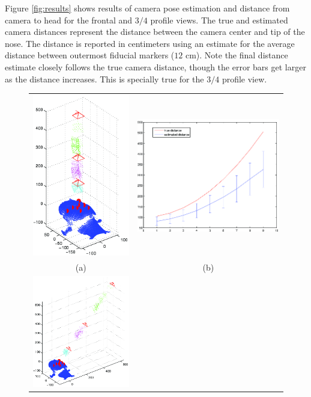 \documentclass[runningheads]{llncs}
\begin{document}
Figure \ref{fig:results} shows results of camera pose estimation and distance from camera to head for the frontal and $3/4$ profile views.  The true and estimated camera distances represent the distance between the camera center and tip of the nose.  The distance is reported in centimeters using an estimate for the average distance between outermost fiducial markers ($12$ cm). Note the final distance estimate closely follows the true camera distance, though the error bars get larger as the distance increases.  This is specially true for the $3/4$ profile view.   
\begin{figure}[ht]
\begin{tabular}{cc}
\includegraphics[width=.45\linewidth]{resources/figures/cameraloc_frontal.png} &
\includegraphics[width=.45\linewidth]{resources/figures/errorbar_frontal.png} \\
(a) & (b) \\
\includegraphics[width=.45\linewidth]{resources/figures/cameraloc_3q.png} &

\end{tabular}
\end{figure}
\end{document}
